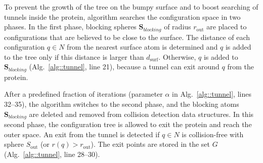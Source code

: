 \documentclass{llncs}
\def\qrand{q_{rand}}
\def\qnear{q_{near}}
\def\qnew{q_{new}}
\def\gprobe{r_{\mathrm{out}}}
\def\Sgprobe{S_{\mathrm{out}}}
\def\SB{\mathbf{S}_{blocking}}
\def\ths{d_\mathrm{surf}}
\begin{document}
To prevent the growth of the tree on the bumpy surface and to boost searching of tunnels inside the protein,
 algorithm searches the configuration space in two phases.
 In the first phase, { blocking spheres} $\SB$ of radius $\gprobe$ are placed
to configurations that are believed to be close to the surface.
The distance of each configuration $q \in N$ from the nearest surface atom is determined and $q$ is
added to the tree only if this distance is larger than $\ths$. 
Otherwise, $q$ is added to $\SB$ (Alg.~\ref{alg::tunnel}, line 21), because a tunnel can exit around $q$ from the protein.


After a predefined fraction of iterations (parameter $\alpha$ in Alg.~\ref{alg::tunnel}, lines 32--35), the algorithm
switches to the second phase, and the blocking atoms $\SB$ are deleted and removed from collision detection data structures.
In this second phase, the configuration tree is allowed to exit the protein and reach the outer space.
An exit from the tunnel is detected if $q \in N$ is collision-free with sphere $\Sgprobe$ (or $r(q) > \gprobe$). 
The exit points are stored in the set $G$ (Alg.~\ref{alg::tunnel}, line 28--30).

\end{document}
